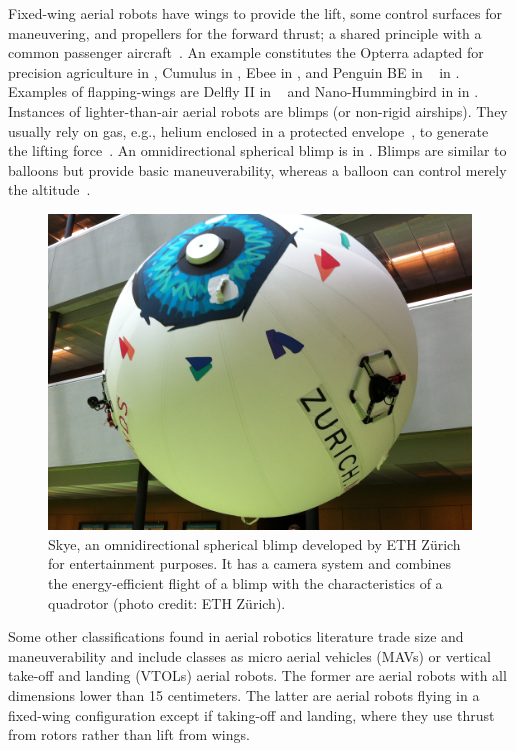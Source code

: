 Fixed-wing aerial robots have wings to provide the lift, some control surfaces for maneuvering, and propellers for the forward thrust; a shared principle with a common passenger aircraft~\citep{corke2017robotics}. An example constitutes the Opterra adapted for precision agriculture in , Cumulus in , Ebee in , and Penguin BE in ~\citep{haugen2016monitoring} in . Examples of flapping-wings are Delfly II in ~\citep{percin2012flow} and Nano-Hummingbird in  in . Instances of lighter-than-air aerial robots are blimps (or non-rigid airships). They usually rely on gas, e.g., helium enclosed in a protected envelope~\citep{burri2013design}, to generate the lifting force~\citep{fui2017recent}. An omnidirectional spherical blimp is in . Blimps are similar to balloons but provide basic maneuverability, whereas a balloon can control merely the altitude~\citep{colombatti2011lighter}.
\begin{figure}[t]
  \sfr
  \centering
  \includegraphics[width=.7\textwidth]{pictures/IMG_2612}
  \caption[Skye, an omnidirectional spherical blimp]{Skye, an omnidirectional spherical blimp developed by ETH Z\"urich for entertainment purposes. It has a camera system and combines the energy-efficient flight of a blimp with the characteristics of a quadrotor {\scriptsize(photo credit: ETH Z\"urich)}.}   
  \label{fig:skye-blimp}
  \efr
\end{figure}
Some other classifications found in aerial robotics literature trade size and maneuverability and include classes as micro aerial vehicles (MAVs) or vertical take-off and landing (VTOLs) aerial robots. The former are aerial robots with all dimensions lower than 15 centimeters. The latter are aerial robots flying in a fixed-wing configuration except if taking-off and landing, where they use thrust from rotors rather than lift from wings. 

